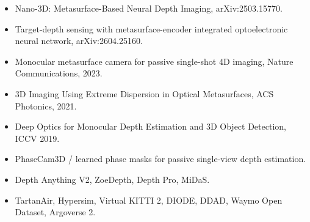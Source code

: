 \documentclass[11pt,a4paper,fontset=none]{ctexart}
\begin{document}
\begin{itemize}
  \item Nano-3D: Metasurface-Based Neural Depth Imaging, arXiv:2503.15770.
  \item Target-depth sensing with metasurface-encoder integrated optoelectronic neural network, arXiv:2604.25160.
  \item Monocular metasurface camera for passive single-shot 4D imaging, Nature Communications, 2023.
  \item 3D Imaging Using Extreme Dispersion in Optical Metasurfaces, ACS Photonics, 2021.
  \item Deep Optics for Monocular Depth Estimation and 3D Object Detection, ICCV 2019.
  \item PhaseCam3D / learned phase masks for passive single-view depth estimation.
  \item Depth Anything V2, ZoeDepth, Depth Pro, MiDaS.
  \item TartanAir, Hypersim, Virtual KITTI 2, DIODE, DDAD, Waymo Open Dataset, Argoverse 2.
\end{itemize}
\end{document}
